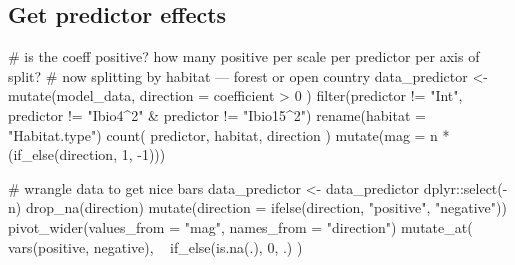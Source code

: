 \documentclass[
]{article}
\newenvironment{Shaded}{}{}
\newcommand{\CommentTok}[1]{\textcolor[rgb]{0.00,0.50,0.00}{#1}}
\newcommand{\DataTypeTok}[1]{#1}
\newcommand{\DecValTok}[1]{#1}
\newcommand{\KeywordTok}[1]{\textcolor[rgb]{0.00,0.00,1.00}{#1}}
\newcommand{\NormalTok}[1]{#1}
\newcommand{\OperatorTok}[1]{#1}
\newcommand{\StringTok}[1]{\textcolor[rgb]{0.00,0.50,0.50}{#1}}
\begin{document}
\hypertarget{get-predictor-effects}{%
\subsection{Get predictor effects}\label{get-predictor-effects}}

\begin{Shaded}
\begin{Highlighting}[]
\CommentTok{# is the coeff positive? how many positive per scale per predictor per axis of split?}
\CommentTok{# now splitting by habitat --- forest or open country}
\NormalTok{data_predictor <-}\StringTok{ }\KeywordTok{mutate}\NormalTok{(model_data,}
  \DataTypeTok{direction =}\NormalTok{ coefficient }\OperatorTok{>}\StringTok{ }\DecValTok{0}
\NormalTok{) }\OperatorTok{%
\StringTok{  }\KeywordTok{filter}\NormalTok{(predictor }\OperatorTok{!=}\StringTok{ "Int"}\NormalTok{, predictor }\OperatorTok{!=}\StringTok{ "Ibio4^2"} \OperatorTok{&}
\StringTok{    }\NormalTok{predictor }\OperatorTok{!=}\StringTok{ "Ibio15^2"}\NormalTok{) }\OperatorTok{%
\StringTok{  }\KeywordTok{rename}\NormalTok{(}\DataTypeTok{habitat =} \StringTok{"Habitat.type"}\NormalTok{) }\OperatorTok{%
\StringTok{  }\KeywordTok{count}\NormalTok{(}
\NormalTok{    predictor,}
\NormalTok{    habitat,}
\NormalTok{    direction}
\NormalTok{  ) }\OperatorTok{%
\StringTok{  }\KeywordTok{mutate}\NormalTok{(}\DataTypeTok{mag =}\NormalTok{ n }\OperatorTok{*}\StringTok{ }\NormalTok{(}\KeywordTok{if_else}\NormalTok{(direction, }\DecValTok{1}\NormalTok{, }\DecValTok{-1}\NormalTok{)))}

\CommentTok{# wrangle data to get nice bars}
\NormalTok{data_predictor <-}\StringTok{ }\NormalTok{data_predictor }\OperatorTok{%
\StringTok{  }\NormalTok{dplyr}\OperatorTok{::}\KeywordTok{select}\NormalTok{(}\OperatorTok{-}\NormalTok{n) }\OperatorTok{%
\StringTok{  }\KeywordTok{drop_na}\NormalTok{(direction) }\OperatorTok{%
\StringTok{  }\KeywordTok{mutate}\NormalTok{(}\DataTypeTok{direction =} \KeywordTok{ifelse}\NormalTok{(direction, }\StringTok{"positive"}\NormalTok{, }\StringTok{"negative"}\NormalTok{)) }\OperatorTok{%
\StringTok{  }\KeywordTok{pivot_wider}\NormalTok{(}\DataTypeTok{values_from =} \StringTok{"mag"}\NormalTok{, }\DataTypeTok{names_from =} \StringTok{"direction"}\NormalTok{) }\OperatorTok{%
\StringTok{  }\KeywordTok{mutate_at}\NormalTok{(}
    \KeywordTok{vars}\NormalTok{(positive, negative),}
    \OperatorTok{~}\StringTok{ }\KeywordTok{if_else}\NormalTok{(}\KeywordTok{is.na}\NormalTok{(.), }\DecValTok{0}\NormalTok{, .)}
\NormalTok{  )}

}}}}}}}}}
\end{Highlighting}
\end{Shaded}
\end{document}
